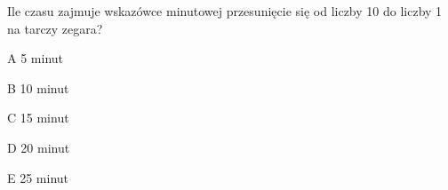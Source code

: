 \begin{tresc}
Ile czasu zajmuje wskazówce minutowej przesunięcie się od liczby 10 do liczby 1 na tarczy zegara?
\end{tresc}
\begin{wariant}{A} 5 minut \end{wariant}
\begin{wariant}{B} 10 minut \end{wariant}
\begin{wariant}{C} 15 minut \end{wariant}
\begin{wariant}{D} 20 minut \end{wariant}
\begin{wariant}{E} 25 minut \end{wariant}
